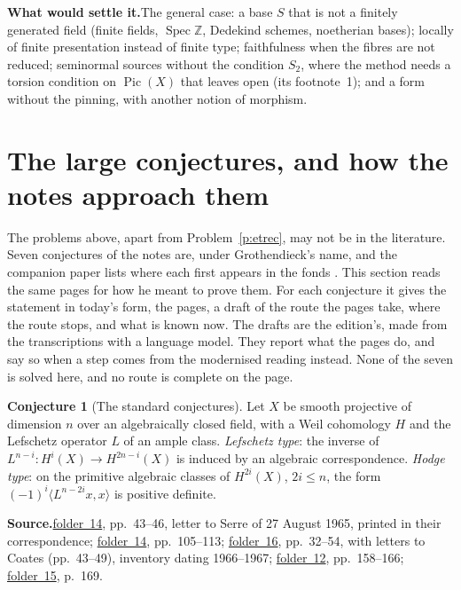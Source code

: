 \documentclass[11pt]{article}
\newcommand{\fac}[1]{\href{https://grothendieck.umontpellier.fr/#1.pdf}{folder~#1}}
\theoremstyle{definition}
\theoremstyle{plain}\newtheorem*{proposition}{Proposition}\theoremstyle{definition}
\newtheorem{bigconj}{Conjecture}
\newcommand{\entry}[1]{\par\medskip\noindent\textbf{#1}\enspace}
\newcommand{\src}[1]{\entry{Source.}#1}
\newcommand{\settle}{\entry{What would settle it.}}
\begin{document}
\settle The general case: a base $S$ that is not a finitely generated field (finite fields, $\operatorname{Spec}\mathbb Z$, Dedekind schemes, noetherian bases); locally of finite presentation instead of finite type; faithfulness when the fibres are not reduced; seminormal sources without the condition $S_2$, where the method needs a torsion condition on $\operatorname{Pic}(X)$ that \cite{chw} leaves open (its footnote~1); and a form without the pinning, with another notion of morphism.

\section{The large conjectures, and how the notes approach them}\label{sec:big}

The problems above, apart from Problem~\ref{p:etrec}, may not be in the literature. Seven conjectures of the notes are, under Grothendieck's name, and the companion paper lists where each first appears in the fonds \cite{huacicm}. This section reads the same pages for how he meant to prove them. For each conjecture it gives the statement in today's form, the pages, a draft of the route the pages take, where the route stops, and what is known now. The drafts are the edition's, made from the transcriptions with a language model. They report what the pages do, and say so when a step comes from the modernised reading instead. None of the seven is solved here, and no route is complete on the page.

\begin{bigconj}[The standard conjectures]\label{c:std}
Let $X$ be smooth projective of dimension $n$ over an algebraically closed field, with a Weil cohomology $H$ and the Lefschetz operator $L$ of an ample class. \emph{Lefschetz type}: the inverse of $L^{n-i} : H^i(X) \to H^{2n-i}(X)$ is induced by an algebraic correspondence. \emph{Hodge type}: on the primitive algebraic classes of $H^{2i}(X)$, $2i \le n$, the form $(-1)^i \langle L^{n-2i}x, x\rangle$ is positive definite.
\end{bigconj}

\src{\fac{14}, pp.~43--46, letter to Serre of 27 August 1965, printed in their correspondence; \fac{14}, pp.~105--113; \fac{16}, pp.~32--54, with letters to Coates (pp.~43--49), inventory dating 1966--1967; \fac{12}, pp.~158--166; \fac{15}, p.~169.}
\end{document}
